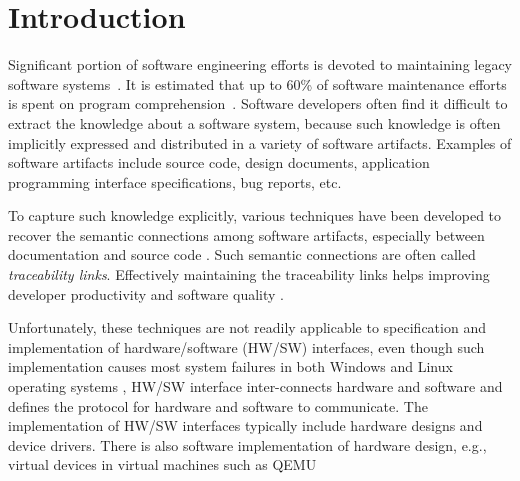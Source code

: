 
\section{Introduction}
\label{sec:introduction}

Significant portion of software engineering efforts is devoted to maintaining legacy software systems~\cite{abran_maintenance_1991}.
It is estimated that up to 60\% of software maintenance efforts is spent on program comprehension~\cite{lawrence_software_2006}.
Software developers often find it difficult to extract the knowledge about a software system,
because such knowledge is often implicitly expressed and distributed in a variety of software artifacts.
Examples of software artifacts include source code, design documents, application programming interface specifications, bug reports, etc.

To capture such knowledge explicitly, various techniques have been developed to recover the semantic connections among software artifacts,
especially between documentation and source code \cite{antoniol_recoveringtraceability_2002} \cite{deLucia_incremental_2006} \cite{marcus_recovering_2003}.
Such semantic connections are often called \textit{traceability links}.
Effectively maintaining the traceability links helps improving developer productivity and software quality \cite{neumuller_case_2006}.

Unfortunately, these techniques are not readily applicable to specification and implementation of hardware/software (HW/SW) interfaces,
even though such implementation causes most system failures in both Windows and Linux operating systems \cite{swift_os_2003} \cite{chou_os_2001},
HW/SW interface inter-connects hardware and software and defines the protocol for hardware and software to communicate.
The implementation of HW/SW interfaces typically include hardware designs and device drivers. There is also software implementation of hardware design, e.g., virtual devices in virtual machines such as QEMU~\cite{Bellard05}

